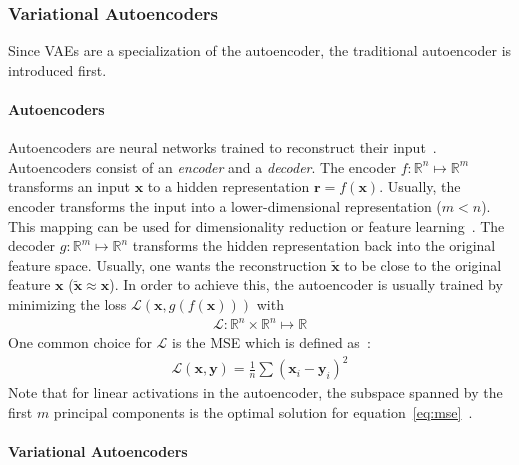 \subsubsection{Variational Autoencoders}\label{subsec:variational-autoencoders}

Since \acfp{VAE} are a specialization of the autoencoder, the traditional autoencoder is introduced first.

\paragraph{Autoencoders}

Autoencoders are neural networks trained to reconstruct their input~\citep[p. 499]{Goodfellow-et-al-2016}.
Autoencoders consist of an \textit{encoder} and a \textit{decoder}.
The encoder $f: \mathbb{R}^n \mapsto \mathbb{R}^m$ transforms an input $\bm{x}$ to a hidden representation $\bm{r} = f(\bm{x})$.
Usually, the encoder transforms the input into a lower-dimensional representation ($m < n$).
This mapping can be used for dimensionality reduction or feature learning~\citep[p. 499]{Goodfellow-et-al-2016}.
The decoder $g: \mathbb{R}^m \mapsto \mathbb{R}^n$ transforms the hidden representation back into the original feature space.
Usually, one wants the reconstruction $\tilde{\bm{x}}$ to be close to the original feature $\bm{x}$ ($\tilde{\bm{x}} \approx \bm{x}$).
In order to achieve this, the autoencoder is usually trained by minimizing the loss $\mathcal{L}(\bm{x}, g(f(\bm{x})))$ with
\begin{align}
    \mathcal{L}: \mathbb{R}^n \times \mathbb{R}^n \mapsto \mathbb{R}
\end{align}
One common choice for $\mathcal{L}$ is the \ac{MSE} which is defined as~\citep[p. 106]{Goodfellow-et-al-2016}:
\begin{align}
    \mathcal{L}(\bm{x}, \bm{y}) = \frac{1}{n}\sum (\bm{x}_i - \bm{y}_i)^2 \label{eq:mse}
\end{align}
Note that for linear activations in the autoencoder, the subspace spanned by the first $m$ principal components is the optimal solution for equation~\ref{eq:mse}~\citep{chicco2014deep}.

\paragraph{Variational Autoencoders}


